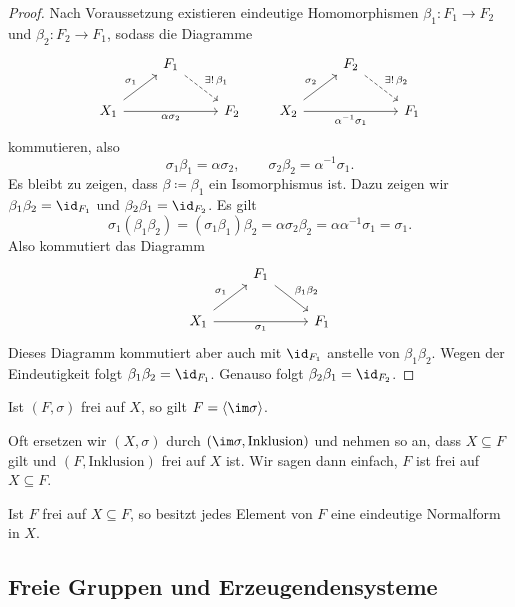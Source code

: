 \documentclass[11pt]{article}
\begin{document}
\begin{proof}
  Nach Voraussetzung existieren eindeutige Homomorphismen $\beta_1\colon F_1 \to F_2$ und $\beta_2\colon F_2 \to F_1$, sodass die Diagramme
  \[
    \begin{tikzcd}
      & F_1 \arrow[dashed]{dr}{\exists!\, \beta_1} & \\
      X_1 \arrow{ur}{\sigma_1} \arrow[swap]{rr}{\alpha\sigma_2} & & F_2
    \end{tikzcd}
    \qquad
    \begin{tikzcd}
      & F_2 \arrow[dashed]{dr}{\exists!\, \beta_2} & \\
      X_2 \arrow{ur}{\sigma_2} \arrow[swap]{rr}{\alpha^{-1}\sigma_1} & & F_1
    \end{tikzcd}
  \]
  kommutieren, also
  \[ \sigma_1\beta_1 = \alpha\sigma_2, \qquad \sigma_2\beta_2 = \alpha^{-1}\sigma_1. \]
  Es bleibt zu zeigen, dass $\beta \coloneqq \beta_1$ ein Isomorphismus ist. Dazu zeigen wir $\beta_1\beta_2 = \id_{F_1}$ und $\beta_2\beta_1 = \id_{F_2}$. Es gilt
  \[ \sigma_1(\beta_1\beta_2) = (\sigma_1\beta_1)\beta_2 = \alpha\sigma_2\beta_2 = \alpha\alpha^{-1}\sigma_1 = \sigma_1. \]
  Also kommutiert das Diagramm
  \[
    \begin{tikzcd}
      & F_1 \arrow{dr}{\beta_1\beta_2} & \\
      X_1 \arrow{ur}{\sigma_1} \arrow[swap]{rr}{\sigma_1} & & F_1
    \end{tikzcd}
  \]
  Dieses Diagramm kommutiert aber auch mit $\id_{F_1}$ anstelle von $\beta_1\beta_2$. Wegen der Eindeutigkeit folgt $\beta_1\beta_2 = \id_{F_1}$. Genauso folgt $\beta_2\beta_1 = \id_{F_2}$.
\end{proof}

\begin{corollary}
  Ist $(F, \sigma)$ frei auf $X$, so gilt $F = \langle \im\sigma \rangle$.
\end{corollary}


Oft ersetzen wir $(X, \sigma)$ durch $(\im\sigma, \text{Inklusion})$ und nehmen so an, dass $X \subseteq F$ gilt und $(F, \text{Inklusion})$ frei auf $X$ ist. Wir sagen dann einfach, $F$ ist frei auf $X \subseteq F$.

\begin{corollary}
  Ist $F$ frei auf $X \subseteq F$, so besitzt jedes Element von $F$ eine eindeutige Normalform in $X$.
\end{corollary}


\subsection{Freie Gruppen und Erzeugendensysteme}
\end{document}
